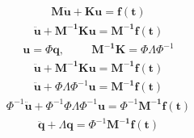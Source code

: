\documentclass[letterpaper,10pt,english]{sphinxmanual}
\begin{document}
\begin{equation*}
\end{equation*}\begin{equation*}
\begin{split}\mathbf{M\ddot{u}} + \mathbf{Ku} = \mathbf{f(t)}\end{split}
\end{equation*}\begin{equation*}
\begin{split}\mathbf{\ddot{u}}  + \mathbf{M^{-1}Ku} = \mathbf{M^{-1}f(t)}\end{split}
\end{equation*}\begin{equation*}
\begin{split}\mathbf{u} =  \Phi \mathbf{q}, \hspace{1cm} \mathbf{M^{-1}K} = \Phi\Lambda\Phi^{-1}\end{split}
\end{equation*}\begin{equation*}
\begin{split}\mathbf{\ddot{u}}  + \mathbf{M^{-1}Ku} = \mathbf{M^{-1}f(t)}\end{split}
\end{equation*}\begin{equation*}
\begin{split}\mathbf{\ddot{u}}  + \Phi\Lambda\Phi^{-1}\mathbf{u} = \mathbf{M^{-1}f(t)}\end{split}
\end{equation*}\begin{equation*}
\begin{split}\Phi^{-1}\mathbf{\ddot{u}}  + \Phi^{-1}\Phi\Lambda\Phi^{-1}\mathbf{u} = \Phi^{-1}\mathbf{M^{-1}f(t)}\end{split}
\end{equation*}\begin{equation*}
\begin{split}\mathbf{\ddot{q}}  + \Lambda\mathbf{q} = \Phi^{-1}\mathbf{M^{-1}f(t)}\end{split}
\end{equation*}
\end{document}
